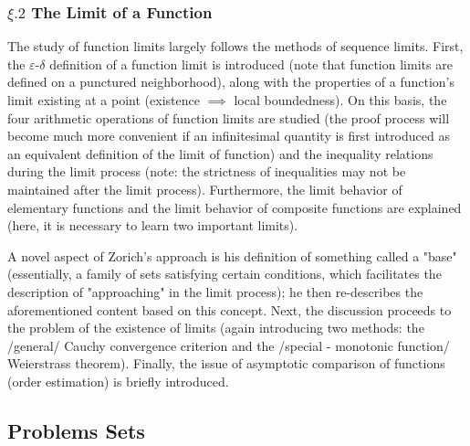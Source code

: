 \subsubsection{$\xi.2$ The Limit of a Function}
The study of function limits largely follows the methods of sequence limits. First, the $\varepsilon$-$\delta$ definition of a function limit is introduced 
(note that function limits are defined on a punctured neighborhood), along with the properties of a function's limit existing at a point (existence $\implies$ 
local boundedness). On this basis, the four arithmetic operations of function limits are studied (the proof process will become much more convenient if an 
infinitesimal quantity is first introduced as an equivalent definition of the limit of function) and the inequality relations during the limit process (note: 
the strictness of inequalities may not be maintained after the limit process). Furthermore, the limit behavior of elementary functions and the limit behavior of 
composite functions are explained (here, it is necessary to learn two important limits). 

A novel aspect of Zorich's approach is his definition of something called a "base" (essentially, a family of sets satisfying certain conditions, which facilitates 
the description of "approaching" in the limit process); he then re-describes the aforementioned content based on this concept. Next, the discussion proceeds to 
the problem of the existence of limits (again introducing two methods: the /general/ Cauchy convergence criterion and the /special - monotonic function/ Weierstrass 
theorem). Finally, the issue of asymptotic comparison of functions (order estimation) is briefly introduced.
\newline\newline
{}

\newpage
\subsection{Problems Sets}
